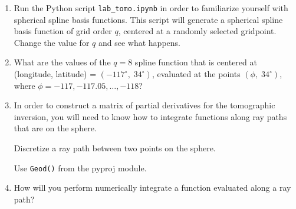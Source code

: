 \documentclass[11pt,titlepage,fleqn]{article}
\begin{document}
\begin{enumerate}

\item Run the Python script \verb+lab_tomo.ipynb+ in order to familiarize yourself with spherical spline basis functions. This script will generate a spherical spline basis function of grid order $q$, centered at a randomly selected gridpoint. Change the value for $q$ and see what happens. 

\item What are the values of the $q=8$ spline function that is centered at (longitude, latitude) = $(-117^\circ,\;34^\circ)$, evaluated at the points $(\phi,\;34^\circ)$, where $\phi = -117, -117.05, \ldots, -118$?

\item In order to construct a matrix of partial derivatives for the tomographic inversion, you will need to know how to integrate functions along ray paths that are on the sphere. 

Discretize a ray path between two points on the sphere.

Use \verb+Geod()+ from the pyproj module.

\item How will you perform numerically integrate a function evaluated along a ray path?

\end{enumerate}



\end{document}
